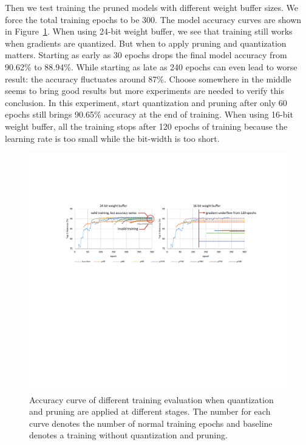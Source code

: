 Then we test training the pruned models with different weight buffer sizes. We force the total training epochs to be 300. The model accuracy curves are shown in Figure~\ref{fig:fixed_train_exp}. When using 24-bit weight buffer, we see that training still works when gradients are quantized. But when to apply pruning and quantization matters. Starting as early as 30 epochs drops the final model accuracy from 90.62\% to 88.94\%. While starting as late as 240 epochs can even lead to worse result: the accuracy fluctuates around 87\%. Choose somewhere in the middle seems to bring good results but more experiments are needed to verify this conclusion. In this experiment, start quantization and pruning after only 60 epochs still brings 90.65\% accuracy at the end of training. When using 16-bit weight buffer, all the training stops after 120 epochs of training because the learning rate is too small while the bit-width is too short.

\begin{figure}[tb]
  \centering
  \includegraphics[width=2.0\columnwidth]{figures/fixed_train_exp.pdf}
  \caption{Accuracy curve of different training evaluation when quantization and pruning are applied at different stages. The number for each curve denotes the number of normal training epochs and baseline denotes a training without quantization and pruning. }
  \label{fig:fixed_train_exp}
\end{figure}

